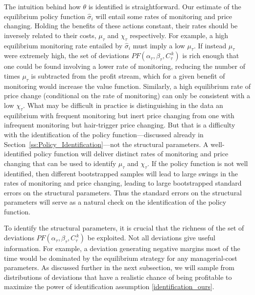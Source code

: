 \documentclass[11pt]{article}
\newcommand{\cut}[1]{C_{\tau}^{\,#1}}
\begin{document}
\begin{spacing}{1.3}
The intuition behind how $\theta$ is identified is
straightforward. Our estimate of the equilibrium policy function
$\hat{\sigma}_{i}$ will entail some rates of monitoring and price
changing. Holding the benefits of these actions constant, their rates
should be inversely related to their costs, $\mu_\tau$ and $\chi_\tau$
respectively. For example, a high equilibrium monitoring rate entailed
by $\hat{\sigma}_{i}$ must imply a low $\mu_\tau$. If instead
$\mu_\tau$ were extremely high, the set of deviations
$PF(\alpha_{\tau},\beta_{\tau},\cut{k})$ is rich enough that one could
be found involving a lower rate of monitoring, reducing the number of
times $\mu_\tau$ is subtracted from the profit stream, which for a
given benefit of monitoring would increase the value
function. Similarly, a high equilibrium rate of price change
(conditional on the rate of monitoring) can only be consistent with a
low $\chi_\tau$. What may be difficult in practice is distinguishing
in the data an equilibrium with frequent monitoring but inert price
changing from one with infrequent monitoring but hair-trigger price
changing. But that is a difficulty with the identification of the
policy function---discussed already in
Section~\ref{ss:Policy_Identification}---not the structural
parameters. A well-identified policy function will deliver distinct
rates of monitoring and price changing that can be used to identify
$\mu_\tau$ and $\chi_\tau$. If the policy function is not well
identified, then different bootstrapped samples will lead to large
swings in the rates of monitoring and price changing, leading to large
bootstrapped standard errors on the structural parameters. Thus the
standard errors on the structural parameters will serve as a natural
check on the identification of the policy function.

To identify the structural parameters, it is crucial that the richness
of the set of deviations $PF(\alpha_{\tau},\beta_{\tau},\cut{k})$ be
exploited.  Not all deviations give useful information. For example, a
deviation generating negative margins most of the time would be
dominated by the equilibrium strategy for any managerial-cost
parameters. As discussed further in the next subsection, we will
sample from distributions of deviations that have a realistic chance
of being profitable to maximize the power of identification assumption
\eqref{identification_ours}.


\end{spacing}
\end{document}
